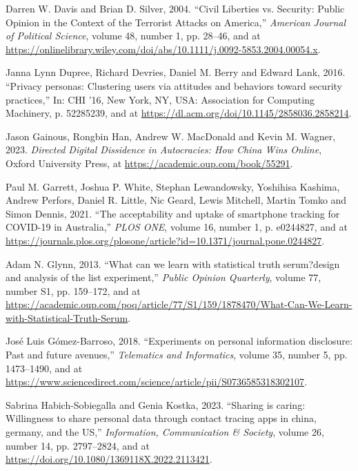 \documentclass[
  letterpaper,
  DIV=11,
  numbers=noendperiod]{scrartcl}
\newlength{\cslhangindent}
\newenvironment{CSLReferences}[2] %
 {\begin{list}{}{%
  \setlength{\itemindent}{0pt}
  \setlength{\leftmargin}{0pt}
  \setlength{\parsep}{0pt}
  \ifodd #1
   \setlength{\leftmargin}{\cslhangindent}
   \setlength{\itemindent}{-1\cslhangindent}
  \fi
  \setlength{\itemsep}{#2\baselineskip}}}
 {\end{list}}
\begin{document}
\begin{CSLReferences}{1}{1}
Darren W. Davis and Brian D. Silver, 2004. {``Civil Liberties vs.
Security: Public Opinion in the Context of the Terrorist Attacks on
America,''} \emph{American Journal of Political Science}, volume 48,
number 1, pp. 28--46, and at
\url{https://onlinelibrary.wiley.com/doi/abs/10.1111/j.0092-5853.2004.00054.x}.

Janna Lynn Dupree, Richard Devries, Daniel M. Berry and Edward Lank,
2016. {``Privacy personas: Clustering users via attitudes and behaviors
toward security practices,''} In: CHI '16, New York, NY, USA:
Association for Computing Machinery, p. 52285239, and at
\url{https://dl.acm.org/doi/10.1145/2858036.2858214}.

Jason Gainous, Rongbin Han, Andrew W. MacDonald and Kevin M. Wagner,
2023. \emph{Directed Digital Dissidence in Autocracies: How China Wins
Online}, Oxford University Press, at
\url{https://academic.oup.com/book/55291}.

Paul M. Garrett, Joshua P. White, Stephan Lewandowsky, Yoshihisa
Kashima, Andrew Perfors, Daniel R. Little, Nic Geard, Lewis Mitchell,
Martin Tomko and Simon Dennis, 2021. {``The acceptability and uptake of
smartphone tracking for COVID-19 in Australia,''} \emph{PLOS ONE},
volume 16, number 1, p. e0244827, and at
\url{https://journals.plos.org/plosone/article?id=10.1371/journal.pone.0244827}.

Adam N. Glynn, 2013. {``What can we learn with statistical truth
serum?design and analysis of the list experiment,''} \emph{Public
Opinion Quarterly}, volume 77, number S1, pp. 159--172, and at
\url{https://academic.oup.com/poq/article/77/S1/159/1878470/What-Can-We-Learn-with-Statistical-Truth-Serum}.

José Luis Gómez-Barroso, 2018. {``Experiments on personal information
disclosure: Past and future avenues,''} \emph{Telematics and
Informatics}, volume 35, number 5, pp. 1473--1490, and at
\url{https://www.sciencedirect.com/science/article/pii/S0736585318302107}.

Sabrina Habich-Sobiegalla and Genia Kostka, 2023. {``Sharing is caring:
Willingness to share personal data through contact tracing apps in
china, germany, and the US,''} \emph{Information, Communication \&
Society}, volume 26, number 14, pp. 2797--2824, and at
\url{https://doi.org/10.1080/1369118X.2022.2113421}.


\end{CSLReferences}
\end{document}
